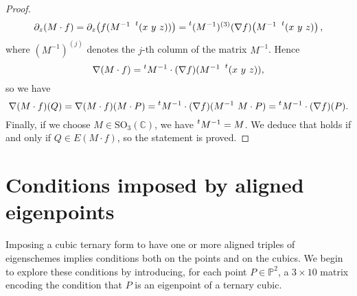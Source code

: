 \documentclass[11pt, a4paper, reqno, captions=tableheading,bibliography=totoc]{scrartcl}
\theoremstyle{plain}
\theoremstyle{definition}
\newcommand{\p}{\mathbb{P}}
\begin{document}
\begin{proof}
\begin{gather*}
\partial_z (M\cdot f) = \partial_z  \bigl( f(M^{-1}  \ \prescript{t} {} (x \ y \ z)) \bigr) = \prescript{t} {}(M^{-1})^{(3)}(\nabla f) \bigl( M^{-1}\   \prescript{t} {} (x \ y \ z) \bigr) \,,
\end{gather*}
%
where $(M^{-1})^{(j)}$ denotes the $j$-th column of the matrix $M^{-1}$. Hence
%
\[
\nabla (M \cdot f) = \prescript{t} {} M^{-1} \cdot (\nabla f) (M^{-1}\   \prescript{t} {} (x \ y \ z)),
\]
%
so we have
%
\[
\nabla (M \cdot f)(Q)=\nabla (M \cdot f)(M \cdot P)=
\prescript{t} {} M^{-1} \cdot (\nabla f) (M^{-1}\   M \cdot P)=\prescript{t} {} M^{-1} \cdot (\nabla f)(P).
\]
%
Finally, if we choose $M \in \mathrm{SO}_3(\mathbb{C})$, we have
$\prescript{t} {} M^{-1}=M$. We deduce that
 holds if and only if $Q \in E(M\cdot f)$, so the statement is proved.
\end{proof}

\section{Conditions imposed by aligned eigenpoints}
\label{conditions}

Imposing a cubic ternary form to have one or more aligned triples of eigenschemes implies conditions both on the points and on the cubics.
We begin to explore these conditions by introducing, for each point
$P \in \p^2$,
a $3 \times 10$ matrix encoding the condition that $P$ is an eigenpoint of a ternary cubic.
\end{document}
